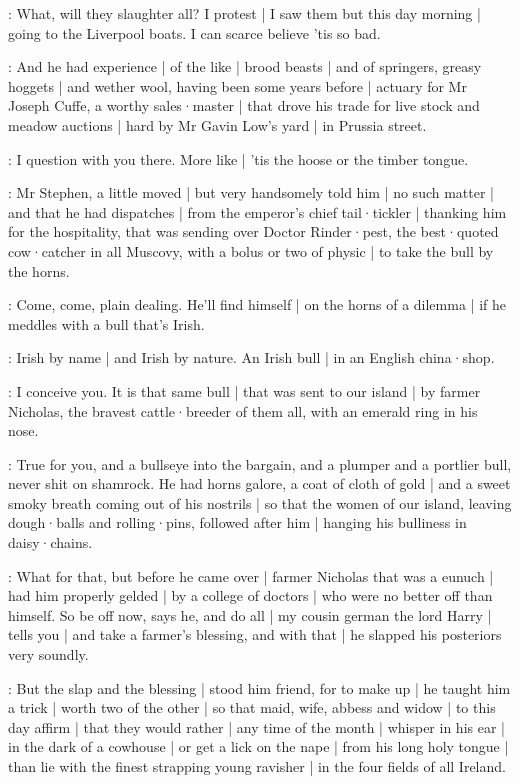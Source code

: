 \Bloom:
What,
will they slaughter all?
I protest |
I saw them but this day morning |
going to the Liverpool boats.
I can scarce believe 'tis so bad.

:
And he had experience |
of the like |
brood beasts |
and of springers,
greasy hoggets |
and wether wool,
having been some years before |
actuary for Mr Joseph Cuffe,
a worthy sales·master |
that drove his trade for live stock and meadow auctions |
hard by Mr Gavin Low's yard |
in Prussia street.

\Bloom:
I question with you there.
More like |
'tis the hoose or the timber tongue.

:
Mr Stephen,
a little moved |
but very handsomely told him |
no such matter |
and that he had dispatches |
from the emperor's chief tail·tickler |
thanking him for the hospitality,
that was sending over Doctor Rinder·pest,
the best·quoted cow·catcher in all Muscovy,
with a bolus or two of physic |
to take the bull by the horns.

\lynch:
Come,
come,
plain dealing.
He'll find himself |
on the horns of a dilemma |
if he meddles with a bull that's Irish.

\stephen:
Irish by name |
and Irish by nature.
An Irish bull |
in an English china·shop.

\dixon:
I conceive you.
It is that same bull |
that was sent to our island |
by farmer Nicholas,
the bravest cattle·breeder of them all,
with an emerald ring in his nose.

\lynch:
True for you,
and a bullseye into the bargain,
and a plumper and a portlier bull,
never shit on shamrock.
He had horns galore,
a coat of cloth of gold |
and a sweet smoky breath coming out of his nostrils |
so that the women of our island,
leaving dough·balls and rolling·pins,
followed after him |
hanging his bulliness in daisy·chains.

\dixon:
What for that,
but before he came over |
farmer Nicholas that was a eunuch |
had him properly gelded |
by a college of doctors |
who were no better off than himself.
So be off now,
says he,
and do all |
my cousin german the lord Harry |
tells you |
and take a farmer's blessing,
and with that |
he slapped his posteriors very soundly.

\lynch:
But the slap and the blessing |
stood him friend,
for to make up |
he taught him a trick |
worth two of the other |
so that maid,
wife,
abbess and widow |
to this day affirm |
that they would rather |
any time of the month |
whisper in his ear |
in the dark of a cowhouse |
or get a lick on the nape |
from his long holy tongue |
than lie with the finest strapping young ravisher |
in the four fields of all Ireland.

